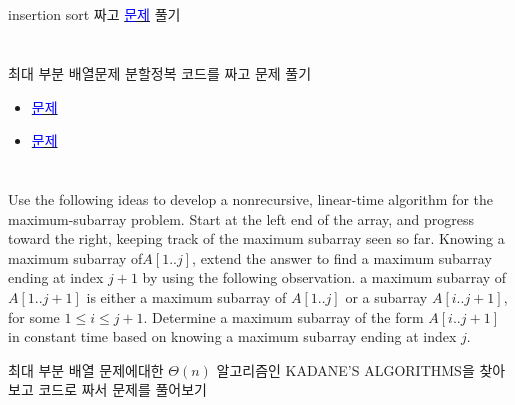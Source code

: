 \documentclass{oblivoir}
\begin{document}
   \section{}
   
   insertion sort 짜고 \href{https.//www.acmicpc.net/problem/2750}{\textcolor{blue}{문제}} 풀기

   
   \section{}
   
   최대 부분 배열문제 분할정복 코드를 짜고 문제 풀기

   \begin{itemize}
      \item \href{https.//www.acmicpc.net/problem/1912}{\textcolor{blue}{문제}}
      
      \item \href{https.//www.acmicpc.net/problem/10211}{\textcolor{blue}{문제}}
   \end{itemize}
   

   \section{}
   
   Use the following ideas to develop a nonrecursive, linear-time algorithm for the maximum-subarray problem. 
   Start at the left end of the array, and progress toward the right, keeping track of the maximum subarray seen so far. 
   Knowing a maximum subarray of$ A[1.. j]$, extend the answer to find a maximum subarray ending at index $j+1$ by using the following observation. a maximum subarray of$ A[1.. j+1]$
is either a maximum subarray of $A[1.. j]$ or a subarray $A[i.. j + 1]$, for some
$1 \le i \le j + 1$. Determine a maximum subarray of the form $A[i.. j + 1]$ in
constant time based on knowing a maximum subarray ending at index $j$.

   최대 부분 배열 문제에대한 $\Theta(n)$ 알고리즘인 KADANE'S ALGORITHMS을 찾아보고 코드로 짜서 문제를 풀어보기
   
\end{document}
